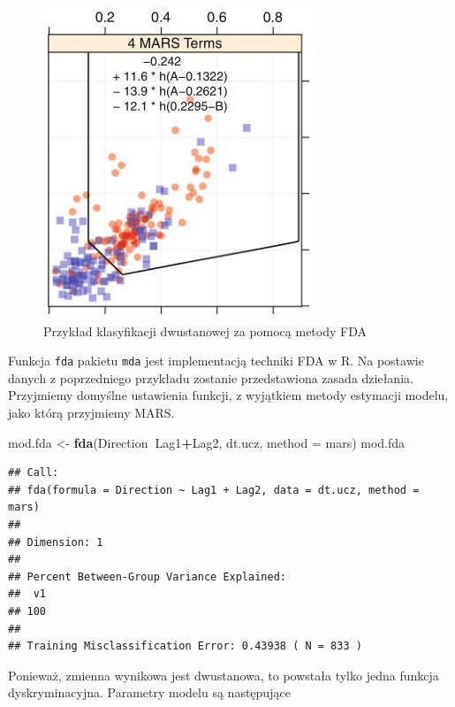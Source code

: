 \documentclass[]{book}
\newenvironment{Shaded}{\begin{snugshade}}{\end{snugshade}}
\newcommand{\DataTypeTok}[1]{\textcolor[rgb]{0.13,0.29,0.53}{#1}}
\newcommand{\KeywordTok}[1]{\textcolor[rgb]{0.13,0.29,0.53}{\textbf{#1}}}
\newcommand{\NormalTok}[1]{#1}
\newcommand{\OperatorTok}[1]{\textcolor[rgb]{0.81,0.36,0.00}{\textbf{#1}}}
\newcommand{\StringTok}[1]{\textcolor[rgb]{0.31,0.60,0.02}{#1}}
\theoremstyle{plain}
\theoremstyle{definition}
\theoremstyle{definition}
\theoremstyle{definition}
\theoremstyle{definition}
\theoremstyle{remark}
\let\BeginKnitrBlock\begin \let\EndKnitrBlock\end
\begin{document}
\begin{figure}

{\centering \includegraphics{images/fda} 

}

\caption{Przykład klasyfikacji dwustanowej za pomocą metody FDA}\label{fig:fda}
\end{figure}

\BeginKnitrBlock{example}
\protect\hypertarget{exm:przykFDA}{}{\label{exm:przykFDA} }Funkcja \texttt{fda} pakietu \texttt{mda} jest implementacją techniki FDA w R. Na postawie danych z poprzedniego przykładu zostanie przedstawiona zasada dziełania. Przyjmiemy domyślne ustawienia funkcji, z wyjątkiem metody estymacji modelu, jako którą przyjmiemy MARS.
\EndKnitrBlock{example}

\begin{Shaded}
\begin{Highlighting}[]
\NormalTok{mod.fda <-}\StringTok{ }\KeywordTok{fda}\NormalTok{(Direction}\OperatorTok{~}\NormalTok{Lag1}\OperatorTok{+}\NormalTok{Lag2, dt.ucz, }\DataTypeTok{method =}\NormalTok{ mars)}
\NormalTok{mod.fda}
\end{Highlighting}
\end{Shaded}

\begin{verbatim}
## Call:
## fda(formula = Direction ~ Lag1 + Lag2, data = dt.ucz, method = mars)
## 
## Dimension: 1 
## 
## Percent Between-Group Variance Explained:
##  v1 
## 100 
## 
## Training Misclassification Error: 0.43938 ( N = 833 )
\end{verbatim}

Ponieważ, zmienna wynikowa jest dwustanowa, to powstała tylko jedna funkcja dyskryminacyjna.
Parametry modelu są następujące
\end{document}
